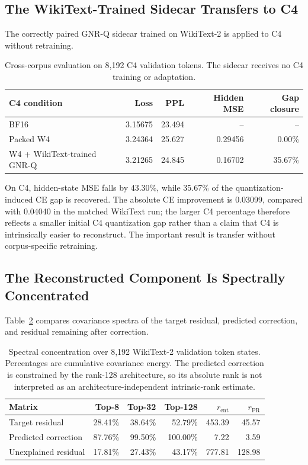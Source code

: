 \documentclass[11pt]{article}
\begin{document}
\subsection{The WikiText-Trained Sidecar Transfers to C4}

The correctly paired GNR-Q sidecar trained on WikiText-2 is applied to C4 without retraining.

\begin{table}[t]
\centering
\small
\begin{tabular}{lrrrr}
\toprule
C4 condition & Loss & PPL & Hidden MSE & Gap closure \\
\midrule
BF16 & 3.15675 & 23.494 & -- & -- \\
Packed W4 & 3.24364 & 25.627 & 0.29456 & 0.00\% \\
W4 + WikiText-trained GNR-Q & 3.21265 & 24.845 & 0.16702 & 35.67\% \\
\bottomrule
\end{tabular}
\caption{Cross-corpus evaluation on 8,192 C4 validation tokens. The sidecar receives no C4 training or adaptation.}
\label{tab:c4}
\end{table}

On C4, hidden-state MSE falls by 43.30\%, while 35.67\% of the quantization-induced CE gap is recovered. The absolute CE improvement is 0.03099, compared with 0.04040 in the matched WikiText run; the larger C4 percentage therefore reflects a smaller initial C4 quantization gap rather than a claim that C4 is intrinsically easier to reconstruct. The important result is transfer without corpus-specific retraining.

\subsection{The Reconstructed Component Is Spectrally Concentrated}

Table~\ref{tab:spectrum} compares covariance spectra of the target residual, predicted correction, and residual remaining after correction.

\begin{table}[t]
\centering
\small
\begin{tabular}{lrrrrr}
\toprule
Matrix & Top-8 & Top-32 & Top-128 & $r_{\mathrm{ent}}$ & $r_{\mathrm{PR}}$ \\
\midrule
Target residual & 28.41\% & 38.64\% & 52.79\% & 453.39 & 45.57 \\
Predicted correction & 87.76\% & 99.50\% & 100.00\% & 7.22 & 3.59 \\
Unexplained residual & 17.81\% & 27.43\% & 43.17\% & 777.81 & 128.98 \\
\bottomrule
\end{tabular}
\caption{Spectral concentration over 8,192 WikiText-2 validation token states. Percentages are cumulative covariance energy. The predicted correction is constrained by the rank-128 architecture, so its absolute rank is not interpreted as an architecture-independent intrinsic-rank estimate.}
\label{tab:spectrum}
\end{table}
\end{document}
